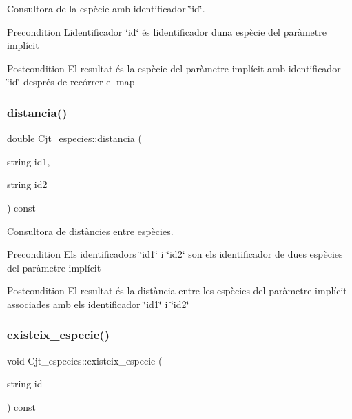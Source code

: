 Consultora de la espècie amb identificador \char`\"{}id\char`\"{}. 

\begin{DoxyPrecond}{Precondition}
L\textquotesingle{}identificador \char`\"{}id\char`\"{} és l\textquotesingle{}identificador d\textquotesingle{}una espècie del paràmetre implícit 
\end{DoxyPrecond}
\begin{DoxyPostcond}{Postcondition}
El resultat és la espècie del paràmetre implícit amb identificador \char`\"{}id\char`\"{} després de recórrer el map 
\end{DoxyPostcond}
\mbox{\label{class_cjt__especies_a9ae689689a019cfc1af02efb024ab5ce}} 
\subsubsection{\texorpdfstring{distancia()}{distancia()}}
{\footnotesize\ttfamily double Cjt\+\_\+especies\+::distancia (\begin{DoxyParamCaption}\item[{string}]{id1,  }\item[{string}]{id2 }\end{DoxyParamCaption}) const}



Consultora de distàncies entre espècies. 

\begin{DoxyPrecond}{Precondition}
Els identificadors \char`\"{}id1\char`\"{} i \char`\"{}id2\char`\"{} son els identificador de dues espècies del paràmetre implícit 
\end{DoxyPrecond}
\begin{DoxyPostcond}{Postcondition}
El resultat és la distància entre les espècies del paràmetre implícit associades amb els identificador \char`\"{}id1\char`\"{} i \char`\"{}id2\char`\"{} 
\end{DoxyPostcond}
\mbox{\label{class_cjt__especies_a57dca6b45a06f7eb233878bda1cf7226}} 
\subsubsection{\texorpdfstring{existeix\+\_\+especie()}{existeix\_especie()}}
{\footnotesize\ttfamily void Cjt\+\_\+especies\+::existeix\+\_\+especie (\begin{DoxyParamCaption}\item[{string}]{id }\end{DoxyParamCaption}) const}



